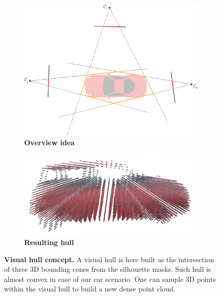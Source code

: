 \begin{figure}[htpb!]
  \centering
  \begin{subfigure}[b]{0.48\linewidth}
    \includegraphics[width=\linewidth]{images/gaussiansplatting/visualhull-idea.png}
    \caption{\textbf{Overview idea}}
    \label{fig:gs-vh-concept}
  \end{subfigure}
  \quad %
  \begin{subfigure}[b]{0.48\linewidth}
    \includegraphics[width=\linewidth]{images/gaussiansplatting/visualhull-res.png}
    \caption{\textbf{Resulting hull}}
    \label{fig:gs-vh-result}
  \end{subfigure}
  \caption{\textbf{Visual hull concept.} A visual hull is here built as the intersection of three 3D bounding cones from the silhouette masks. Such hull is almost convex in case of our car scenario. One can  sample 3D points within the visual hull to build a new dense point cloud.}
  \label{fig:gs-homography-view3}
\end{figure}

